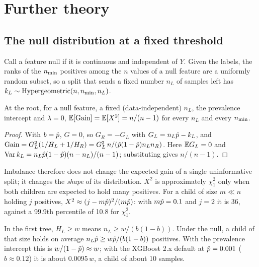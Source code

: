 \section{Further theory}\label{app:theory}

\subsection{The null distribution at a fixed threshold}\label{app:nullmean}

Call a feature null if it is continuous and independent of $Y$. Given the labels, the ranks of the $n_{\min}$ positives among the $n$ values of a null feature are a uniformly random subset, so a split that sends a fixed number $n_L$ of samples left has $k_L\sim\mathrm{Hypergeometric}(n,n_{\min},n_L)$.

\begin{proposition}\label{prop:nullmean}
At the root, for a null feature, a fixed (data-independent) $n_L$, the prevalence intercept and $\lambda = 0$, $\mathbb{E}[\operatorname{Gain}] = \mathbb{E}[X^2] = n/(n-1)$ for every $n_L$ and every $n_{\min}$.
\end{proposition}

\begin{proof}
With $b = \hat p$, $G = 0$, so $G_R = -G_L$ with $G_L = n_L\hat p - k_L$, and $\operatorname{Gain} = G_L^2(1/H_L + 1/H_R) = G_L^2\,n/(\hat p(1-\hat p)n_Ln_R)$. Here $\mathbb{E} G_L = 0$ and $\operatorname{Var}k_L = n_L\hat p(1-\hat p)(n-n_L)/(n-1)$; substituting gives $n/(n-1)$.
\end{proof}

Imbalance therefore does not change the expected gain of a single uninformative split; it changes the \emph{shape} of its distribution. $X^2$ is approximately $\chi^2_1$ only when both children are expected to hold many positives. For a child of size $m\ll n$ holding $j$ positives, $X^2\approx(j - m\hat p)^2/(m\hat p)$: with $m\hat p = 0.1$ and $j = 2$ it is 36, against a 99.9th percentile of 10.8 for $\chi^2_1$.

\begin{proposition}\label{prop:mcw}
In the first tree, $H_L\ge w$ means $n_L\ge w/(b(1-b))$. Under the null, a child of that size holds on average $n_L\hat p\ge w\hat p/(b(1-b))$ positives. With the prevalence intercept this is $w/(1-\hat p)\approx w$; with the XGBoost 2.x default at $\hat p = 0.001$ ($b\approx 0.12$) it is about $0.0095\,w$, a child of about 10 samples.
\end{proposition}

